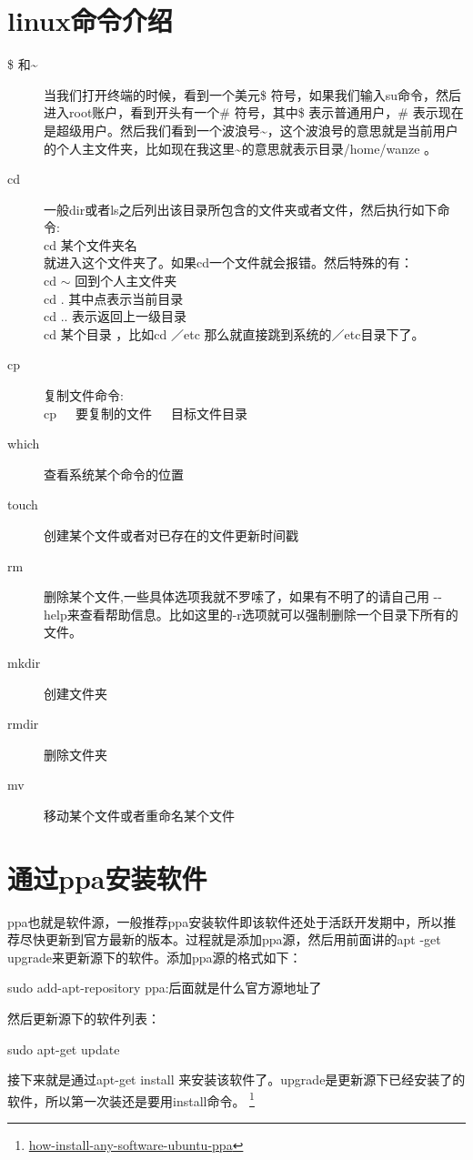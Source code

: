 \documentclass[12pt,oneside]{book}
\begin{document}
\begin{common-format}
\section{linux命令介绍}
\begin{description}
\item[ \${} 和\~{}] 当我们打开终端的时候，看到一个美元\$ 符号，如果我们输入su命令，然后进入root账户，看到开头有一个\#{} 符号，其中\$ 表示普通用户，\#{} 表示现在是超级用户。然后我们看到一个波浪号\~{}，这个波浪号的意思就是当前用户的个人主文件夹，比如现在我这里\~{}的意思就表示目录/home/wanze 。
\item[ cd] 一般dir或者ls之后列出该目录所包含的文件夹或者文件，然后执行如下命令:\\cd 某个文件夹名 \\ 就进入这个文件夹了。如果cd一个文件就会报错。然后特殊的有：\\ cd $\sim$ 回到个人主文件夹\\cd . 其中点表示当前目录\\cd .. 表示返回上一级目录\\cd 某个目录 ，比如cd ／etc 那么就直接跳到系统的／etc目录下了。
\item[ cp] 复制文件命令:\\ cp~~~要复制的文件~~~目标文件目录 
\item[ which] 查看系统某个命令的位置
\item[ touch] 创建某个文件或者对已存在的文件更新时间戳
\item[ rm ]删除某个文件,一些具体选项我就不罗嗦了，如果有不明了的请自己用 -{}- help来查看帮助信息。比如这里的-r选项就可以强制删除一个目录下所有的文件。
\item[ mkdir] 创建文件夹


\item[ rmdir] 删除文件夹
\item[ mv ]移动某个文件或者重命名某个文件
\end{description}

\section{通过ppa安装软件}
ppa也就是软件源，一般推荐ppa安装软件即该软件还处于活跃开发期中，所以推荐尽快更新到官方最新的版本。过程就是添加ppa源，然后用前面讲的apt -get upgrade来更新源下的软件。添加ppa源的格式如下：
\begin{tcbbash}[]
sudo add-apt-repository ppa:后面就是什么官方源地址了
\end{tcbbash}
然后更新源下的软件列表：
\begin{tcbbash}[]
sudo apt-get update
\end{tcbbash}
接下来就是通过apt-get  install 来安装该软件了。upgrade是更新源下已经安装了的软件，所以第一次装还是要用install命令。
\footnote{\href{http://linuxers.org/howto/how-install-any-software-ubuntu-ppa}{how-install-any-software-ubuntu-ppa}}


\end{common-format}
\end{document}

